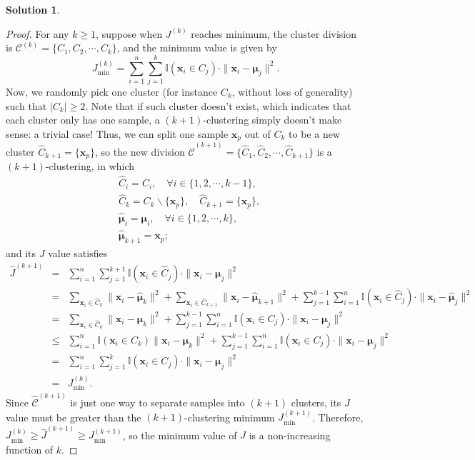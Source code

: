 \documentclass[a4paper,UTF8]{article}
\numberwithin{equation}{section}
\theoremstyle{definition}
\newtheorem*{solution}{Solution}
\begin{document}
\begin{solution}
\begin{proof}
For any $k\geq 1$, suppose when $J^{(k)}$ reaches minimum, the cluster division is $\mathcal C^{(k)}=\{C_1, C_2, \cdots, C_k\}$, and the minimum value is given by
\begin{equation}
J^{(k)}_{\text{min}}=\sum_{i=1}^n\sum_{j=1}^k \mathbb I(\bm{x}_i\in C_j)\cdot \|\bm{x}_i-\bm\mu_j\|^2.
\end{equation}
Now, we randomly pick one cluster (for instance $C_k$, without loss of generality) such that $|C_k|\geq 2$. Note that if such cluster doesn't exist, which indicates that each cluster only has one sample, a $(k+1)$-clustering simply doesn't make sense: a trivial case! Thus, we can split one sample $\bm{x}_p$ out of $C_k$ to be a new cluster $\hat C_{k+1}=\{\bm{x}_p\}$, so the new division $\hat{\mathcal C}^{(k+1)}=\{\hat C_1, \hat C_2, \cdots, \hat C_{k+1}\}$ is a $(k+1)$-clustering, in which
\begin{eqnarray}
&\hat C_i=C_i,\quad \forall i\in\{1,2,\cdots, k-1\},\\
&\hat C_k=C_k\backslash\{\bm{x}_p\}, \quad \hat C_{k+1}=\{\bm{x}_p\},\\
&\hat{\bm{\mu}}_i=\bm\mu_i,\quad \forall i\in\{1,2,\cdots, k\},\\
&\hat{\bm{\mu}}_{k+1}=\bm{x}_{p};
\end{eqnarray}
and its $J$ value satisfies
\begin{eqnarray}
\hat J^{(k+1)}&=&\sum_{i=1}^n\sum_{j=1}^{k+1} \mathbb I(\bm{x}_i\in \hat C_j)\cdot \|\bm{x}_i-\bm\mu_j\|^2\nonumber\\
&=&\sum_{\bm{x}_i\in \hat C_k} \|\bm{x}_i-\hat{\bm\mu}_k\|^2+\sum_{\bm{x}_i\in \hat C_{k+1}} \|\bm{x}_i-\hat{\bm\mu}_{k+1}\|^2+\sum_{j=1}^{k-1}\sum_{i=1}^n \mathbb I(\bm{x}_i\in \hat C_j)\cdot \|\bm{x}_i-\hat{\bm\mu}_j\|^2\nonumber\\
&=&\sum_{\bm{x}_i\in \hat C_k} \|\bm{x}_i-\bm\mu_k\|^2+\sum_{j=1}^{k-1}\sum_{i=1}^n \mathbb I(\bm{x}_i\in C_j)\cdot \|\bm{x}_i-{\bm\mu}_j\|^2\nonumber\\
&\leq&\sum_{i=1}^n\mathbb I(\bm{x}_i\in C_k)\|\bm{x}_i-\bm\mu_k\|^2+\sum_{j=1}^{k-1}\sum_{i=1}^n \mathbb I(\bm{x}_i\in C_j)\cdot \|\bm{x}_i-{\bm\mu}_j\|^2\nonumber\\
&=&\sum_{i=1}^n\sum_{j=1}^{k} \mathbb I(\bm{x}_i\in C_j)\cdot \|\bm{x}_i-{\bm\mu}_j\|^2\nonumber\\
&=&J^{(k)}_{\text{min}}.
\end{eqnarray}
Since $\mathcal{\hat{C}}^{(k+1)}$ is just one way to separate samples into $(k+1)$ clusters, its $J$ value must be greater than the $(k+1)$-clustering minimum $J^{(k+1)}_{\text{min}}$. Therefore, $J^{(k)}_{\text{min}}\geq \hat J^{(k+1)}\geq J^{(k+1)}_{\text{min}}$, so the minimum value of $J$ is a non-increasing function of $k$.

\end{proof}
\end{solution}
\end{document}
